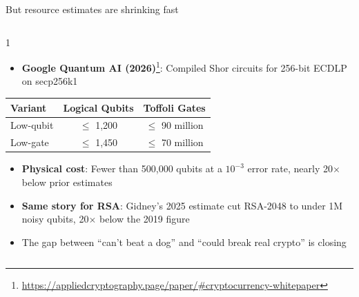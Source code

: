 \ifdefined\PRESENTATION\else\PassOptionsToClass{handout}{beamer}\fi\documentclass[aspectratio=169, lualatex]{beamer}
\begin{document}
\begin{frame}{But resource estimates are shrinking fast}
	\begin{columns}[c]
		\begin{column}{1\textwidth}
			\begin{itemize}
				\item \textbf{Google Quantum AI (2026)}\footnote{\url{https://appliedcryptography.page/paper/\#cryptocurrency-whitepaper}}: Compiled Shor circuits for 256-bit ECDLP on secp256k1
			\end{itemize}
			\begin{center}
				\small
				\begin{tabular}{|l|c|c|}
					\hline
					\textbf{Variant} & \textbf{Logical Qubits} & \textbf{Toffoli Gates} \\
					\hline
					Low-qubit        & $\leq$ 1,200            & $\leq$ 90 million      \\
					Low-gate         & $\leq$ 1,450            & $\leq$ 70 million      \\
					\hline
				\end{tabular}
			\end{center}
			\begin{itemize}
				\item \textbf{Physical cost}: Fewer than 500,000 qubits at a $10^{-3}$ error rate, nearly 20$\times$ below prior estimates
				\item \textbf{Same story for RSA}: Gidney's 2025 estimate cut RSA-2048 to under 1M noisy qubits, 20$\times$ below the 2019 figure
				\item The gap between ``can't beat a dog'' and ``could break real crypto'' is closing
			\end{itemize}
		\end{column}
	\end{columns}
\end{frame}
\end{document}
